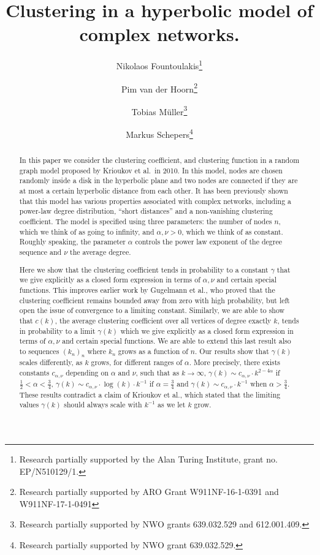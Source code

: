 \documentclass[a4paper,10pt]{article}
\title{Clustering in a hyperbolic model of complex networks.}
\author[1]{Nikolaos Fountoulakis\thanks{Research partially supported by the Alan Turing Institute, grant no. EP/N510129/1.}}
\author[2,3]{Pim van der Hoorn\thanks{Research partially supported by ARO Grant W911NF-16-1-0391 and W911NF-17-1-0491}}
\author[4]{Tobias M\"{u}ller\thanks{Research partially supported by NWO grants 639.032.529 and 612.001.409.}}
\author[4]{Markus Schepers\thanks{Research partially supported by NWO grant 639.032.529.}}
\affil[1]{ School of Mathematics, University of Birmingham, United Kingdom.}
\affil[2]{Department of Mathematics and Computer Science, Eindhoven University of Technology, The Netherlands}
\affil[3]{Department of Physics, Northeastern University, United States.}
\affil[4]{Bernoulli Institute, University of Groningen, The Netherlands.}
\newcommand{\1}{\mathds{1}}								%
\begin{document}
\maketitle

\begin{abstract}
In this paper we consider the clustering coefficient, and clustering function in a random graph model proposed by Krioukov et al.~in 2010. 
In this model, nodes are chosen randomly inside a disk in the hyperbolic plane and two nodes are connected if they are at most a certain 
hyperbolic distance from each other. It has been previously shown that this model has various properties associated with complex networks, 
including a power-law degree distribution, ``short distances'' and a non-vanishing clustering coefficient. 
The model is specified using three parameters: the number of nodes $n$, which we think of as going to infinity, and $\alpha, \nu > 0$, 
which we think of as constant. Roughly speaking, the parameter $\alpha$ controls the power law exponent of the degree sequence 
and $\nu$ the average degree.

Here we show that the clustering coefficient tends in probability to a constant $\gamma$ that we give explicitly as a closed form 
expression in terms of $\alpha, \nu$ and certain special functions. 
This improves earlier work by Gugelmann et al., who proved that the clustering coefficient remains bounded away from zero 
with high probability, but left open the issue of convergence to a limiting constant. Similarly, we are able to show that 
$c(k)$, the average clustering coefficient over all vertices of degree exactly $k$, tends in probability to a limit 
$\gamma(k)$ which we give explicitly as a closed form expression in terms of $\alpha, \nu$ and certain special functions. 
We are able to extend this last result also to sequences $(k_n)_n$ where $k_n$ grows as a function of $n$. 
Our results show that $\gamma(k)$ scales differently, as $k$ grows, for different ranges of $\alpha$. 
More precisely, there exists constants $c_{\alpha,\nu}$ depending on $\alpha$ and $\nu$, such that as $k \to \infty$, 
$\gamma(k) \sim c_{\alpha,\nu} \cdot k^{2 - 4\alpha}$ if $\frac{1}{2} < \alpha < \frac{3}{4}$, 
$\gamma(k) \sim c_{\alpha,\nu} \cdot \log(k) \cdot k^{-1} $ 
if $\alpha=\frac{3}{4}$ and $\gamma(k) \sim c_{\alpha,\nu} \cdot k^{-1}$ when $\alpha > \frac{3}{4}$. 
These results contradict a claim of Krioukov et al., which stated that the limiting values $\gamma(k)$ should always scale 
with $k^{-1}$ as we let $k$ grow. 
\end{abstract}
\end{document}
